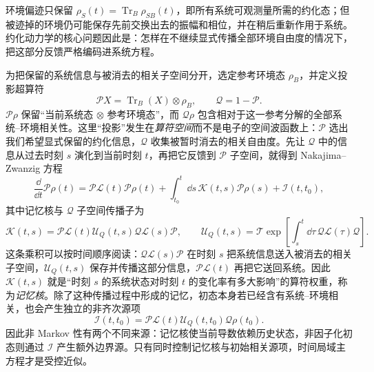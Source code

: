环境偏迹只保留
$\rho_S(t)=\operatorname{Tr}_B\rho_{SB}(t)$，即所有系统可观测量所需的约化态；但被迹掉的环境仍可能保存先前交换出去的振幅和相位，并在稍后重新作用于系统。约化动力学的核心问题因此是：怎样在不继续显式传播全部环境自由度的情况下，把这部分反馈严格编码进系统方程。

为把保留的系统信息与被消去的相关子空间分开，选定参考环境态 $\rho_B$，并定义投影超算符
\[
\mathcal PX=\operatorname{Tr}_B(X)\otimes\rho_B,
\qquad
\mathcal Q=1-\mathcal P.
\]
$\mathcal P\rho$ 保留“当前系统态 $\otimes$ 参考环境态”，而 $\mathcal Q\rho$ 包含相对于这一参考分解的全部系统--环境相关性。这里“投影”发生在\emph{算符空间}而不是电子的空间波函数上：$\mathcal P$ 选出我们希望显式保留的约化信息，$\mathcal Q$ 收集被暂时消去的相关自由度。先让 $\mathcal Q$ 中的信息从过去时刻 $s$ 演化到当前时刻 $t$，再把它反馈到 $\mathcal P$ 子空间，就得到 Nakajima--Zwanzig 方程
\begin{equation}
\boxed{
\frac{\dd}{\dd t}\mathcal P\rho(t)
=\mathcal P\mathcal L(t)\mathcal P\rho(t)
+\int_{t_0}^{t}\dd s\,\mathcal K(t,s)\mathcal P\rho(s)
+\mathcal I(t,t_0),}
\label{eq:exact_nakajima_zwanzig}
\end{equation}
其中记忆核与 $\mathcal Q$ 子空间传播子为
\[
\mathcal K(t,s)
=\mathcal P\mathcal L(t)\mathcal U_Q(t,s)\mathcal Q\mathcal L(s)\mathcal P,
\qquad
\mathcal U_Q(t,s)=\mathcal T\exp\!\left[\int_s^t\dd\tau\,\mathcal Q\mathcal L(\tau)\mathcal Q\right].
\]
这条乘积可以按时间顺序阅读：$\mathcal Q\mathcal L(s)\mathcal P$ 在时刻 $s$ 把系统信息送入被消去的相关子空间，$\mathcal U_Q(t,s)$ 保存并传播这部分信息，$\mathcal P\mathcal L(t)$ 再把它送回系统。因此 $\mathcal K(t,s)$ 就是“时刻 $s$ 的系统状态对时刻 $t$ 的变化率有多大影响”的算符权重，称为\emph{记忆核}。除了这种传播过程中形成的记忆，初态本身若已经含有系统--环境相关，也会产生独立的非齐次源项
\begin{equation}
\boxed{
\mathcal I(t,t_0)
=\mathcal P\mathcal L(t)\mathcal U_Q(t,t_0)\mathcal Q\rho(t_0).}
\label{eq:exact_nz_initial_correlation}
\end{equation}
因此非 Markov 性有两个不同来源：记忆核使当前导数依赖历史状态，非因子化初态则通过 $\mathcal I$ 产生额外边界源。只有同时控制记忆核与初始相关源项，时间局域主方程才是受控近似。

